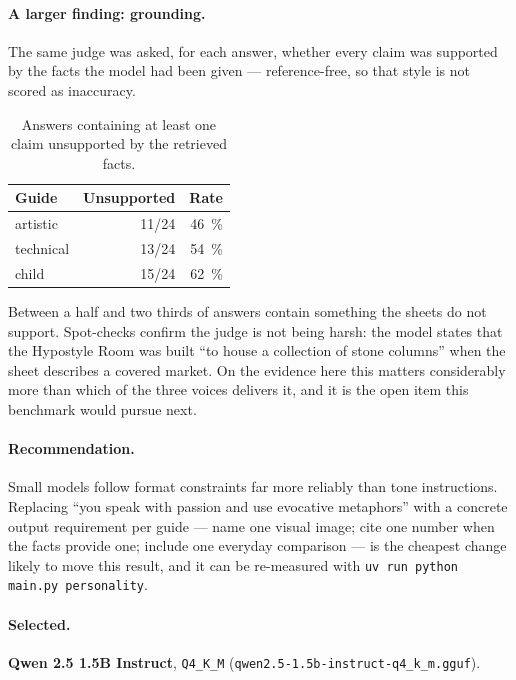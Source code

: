 \documentclass[11pt,a4paper]{article}
\begin{document}
\paragraph{A larger finding: grounding.} The same judge was asked, for each
answer, whether every claim was supported by the facts the model had been given
--- reference-free, so that style is not scored as inaccuracy.

\begin{table}[h]
\centering
\caption{Answers containing at least one claim unsupported by the retrieved facts.}
\begin{tabular}{lrr}
\toprule
\textbf{Guide} & \textbf{Unsupported} & \textbf{Rate} \\
\midrule
artistic  & 11/24 & \SI{46}{\percent} \\
technical & 13/24 & \SI{54}{\percent} \\
child     & 15/24 & \SI{62}{\percent} \\
\bottomrule
\end{tabular}
\end{table}

Between a half and two thirds of answers contain something the sheets do not
support. Spot-checks confirm the judge is not being harsh: the model states that
the Hypostyle Room was built ``to house a collection of stone columns'' when the
sheet describes a covered market. On the evidence here this matters considerably
more than which of the three voices delivers it, and it is the open item this
benchmark would pursue next.

\paragraph{Recommendation.} Small models follow format constraints far more
reliably than tone instructions. Replacing ``you speak with passion and use
evocative metaphors'' with a concrete output requirement per guide --- name one
visual image; cite one number when the facts provide one; include one everyday
comparison --- is the cheapest change likely to move this result, and it can be
re-measured with \texttt{uv run python main.py personality}.

\paragraph{Selected.} \textbf{Qwen 2.5 1.5B Instruct}, \texttt{Q4\_K\_M}
(\texttt{qwen2.5-1.5b-instruct-q4\_k\_m.gguf}).
\end{document}
